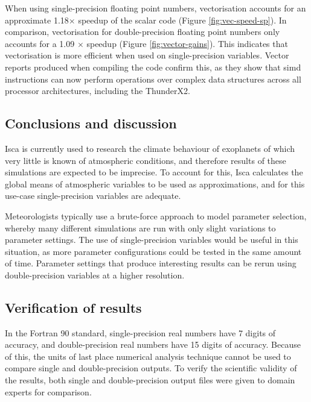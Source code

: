 \documentclass[a4paper,11pt]{report}
\begin{document}
\par
When using single-precision floating point numbers, vectorisation accounts for an approximate 1.18$\times$ speedup of the scalar code (Figure \ref{fig:vec-speed-sp}). In comparison, vectorisation for double-precision floating point numbers only accounts for a 1.09 $\times$ speedup (Figure \ref{fig:vector-gains}). This indicates that vectorisation is more efficient when used on single-precision variables. Vector reports produced when compiling the code confirm this, as they show that \gls{simd} instructions can now perform operations over complex data structures across all processor architectures, including the ThunderX2. 
\par

\subsection{Conclusions and discussion}
\par
Isca is currently used to research the climate behaviour of exoplanets of which very little is known of atmospheric conditions, and therefore results of these simulations are expected to be imprecise. To account for this, Isca calculates the global means of atmospheric variables to be used as approximations, and for this use-case single-precision variables are adequate.
\par
Meteorologists typically use a brute-force approach to model parameter selection, whereby many different simulations are run with only slight variations to parameter settings. The use of single-precision variables would be useful in this situation, as more parameter configurations could be tested in the same amount of time. Parameter settings that produce interesting results can be rerun using double-precision variables at a higher resolution. 

\subsection{Verification of results}
In the Fortran 90 standard, single-precision real numbers have 7 digits of accuracy, and double-precision real numbers have 15 digits of accuracy. Because of this, the units of last place numerical analysis technique cannot be used to compare single and double-precision outputs. To verify the scientific validity of the results, both single and double-precision output files were given to domain experts for comparison. 
\end{document}
